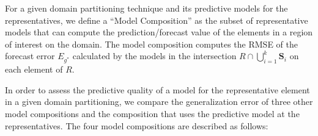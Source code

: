 For a given domain partitioning technique and its predictive models for the representatives, we define a ``Model Composition'' as the subset of representative models that can compute the prediction/forecast value of the elements in a region of interest on the domain. The model composition computes the RMSE of the forecast error $E_{g^{*}}$ calculated by the models in the intersection $R \cap \bigcup_{i=1}^{k} \mathbf{S}_{i}$ on each element of $R$. 

In order to assess the predictive quality of a model for the representative element in a given domain partitioning, we compare the generalization error of three other model compositions and the composition that uses the predictive model at the representatives. The four model compositions are described as follows:

